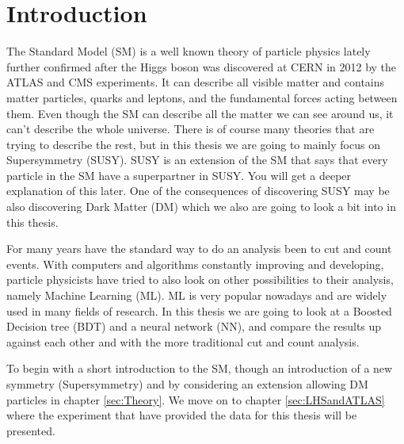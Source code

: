 \chapter*{Introduction}
\label{sec:Introduction}
The Standard Model (SM) \cite{thomson} is a well known theory of particle physics lately further confirmed after the Higgs boson was discovered at CERN in 2012 by the ATLAS \cite{Higgs_ATLAS} and CMS \cite{Higgs_CMS} experiments. It can describe all visible matter and contains matter particles, quarks and leptons, and the fundamental forces acting between them. Even though the SM can describe all the matter we can see around us, it can't describe the whole universe. There is of course many theories that are trying to describe the rest, but in this thesis we are going to mainly focus on Supersymmetry (SUSY). SUSY is an extension of the SM that says that every particle in the SM have a superpartner in SUSY. You will get a deeper explanation of this later. One of the consequences of discovering SUSY may be also discovering Dark Matter (DM) which we also are going to look a bit into in this thesis.

For many years have the standard way to do an analysis been to cut and count events. With computers and algorithms constantly improving and developing, particle physicists have tried to also look on other possibilities to their analysis, namely Machine Learning (ML). ML is very popular nowadays and are widely used in many fields of research. In this thesis we are going to look at a Boosted Decision tree (BDT) and a neural network (NN), and compare the results up against each other and with the more traditional cut and count analysis. 

To begin with a short introduction to the SM, though an introduction of a new symmetry (Supersymmetry) and by considering an extension allowing DM particles in chapter \ref{sec:Theory}. We move on to chapter \ref{sec:LHSandATLAS} where the experiment that have provided the data for this thesis will be presented. 


